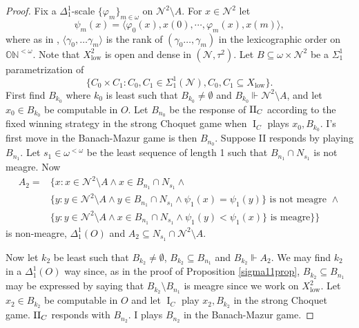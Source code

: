 \documentclass[11pt, english]{article}
\DeclareMathOperator{\I}{I}
\DeclareMathOperator{\low}{low}
\newcommand{\baire}{\mathscr N}
\newcommand{\forces}{\Vdash}
\begin{document}
\begin{proof}
Fix a $\Delta^1_1$-scale $\{\varphi_m\}_{m\in\omega}$ on
$\baire^2\setminus A$. For $x\in\baire^2$ let
$$
\psi_m(x)=\langle\varphi_0(x),x(0),\cdots,\varphi_m(x),x(m)\rangle,
$$
where as in \cite{kechris73},
$\langle\gamma_0,\ldots\gamma_m\rangle$ is the rank of
$(\gamma_0\ldots,\gamma_m)$ in the lexicographic order on
$\mathbb{ON}^{<\omega}$. Note that $X_{\low}^2$ is open and dense in
$(\baire,\tau^2)$. Let $B\subseteq\omega\times\baire^2$ be a
$\Sigma^1_1$ parametrization of
$$
\{C_0\times C_1:C_0,C_1\in\Sigma^1_1(\baire), C_0,C_1\subseteq
X_{\low}\}.
$$
First find $B_{k_0}$ where $k_0$ is least such that
$B_{k_0}\neq\emptyset$ and $B_{k_0}\forces \baire^2\setminus A$,
and let $x_0\in B_{k_0}$ be computable in $O$. Let $B_{n_0}$ be
the response of $\operatorname{II}_C$ according to the fixed winning strategy in
the strong Choquet game when $\I_C$ plays $x_0, B_{k_0}$. I's
first move in the Banach-Mazur game is then $B_{n_0}$. Suppose II
responds by playing $B_{n_1}$. Let $s_1\in \omega^{<\omega}$ be
the least sequence of length 1 such that $B_{n_1}\cap N_{s_1}$ is
not meagre. Now
\begin{align*}
A_2=&\{x: x\in \baire^2\setminus A\wedge x\in B_{n_1}\cap N_{s_1}\wedge\\
&\{y: y\in \baire^2\setminus A\wedge y\in B_{n_1}\cap
N_{s_1}\wedge
\psi_1(x)=\psi_1(y)\}\text{ is not meagre }\wedge\\
&\{y:y\in \baire^2\setminus A\wedge x\in B_{n_1}\cap
N_{s_1}\wedge\psi_1(y)<\psi_1(x)\}\text{ is meagre}\}\}
\end{align*}
is non-meagre, $\Delta^1_1(O)$ and $A_2\subseteq N_{s_1}\cap
\baire^2\setminus A$.

Now let $k_2$ be least such that $B_{k_2}\neq\emptyset$,
$B_{k_2}\subseteq B_{n_1}$ and $B_{k_2}\forces A_2$. We may find
$k_2$ in a $\Delta^1_1(O)$ way since, as in the proof of
Proposition \ref{sigma11prop}, $B_{k_2}\subseteq B_{n_1}$ may be expressed by
saying that $B_{k_2}\setminus B_{n_1}$ is meagre since we work on
$X_{\low}^2$. Let $x_2\in B_{k_2}$ be computable in $O$ and let
$\I_C$ play  $x_2, B_{k_2}$ in the strong Choquet game. $\operatorname{II}_C$
responds with $B_{n_2}$. I plays $B_{n_2}$ in the Banach-Mazur
game.


\end{proof}
\end{document}
